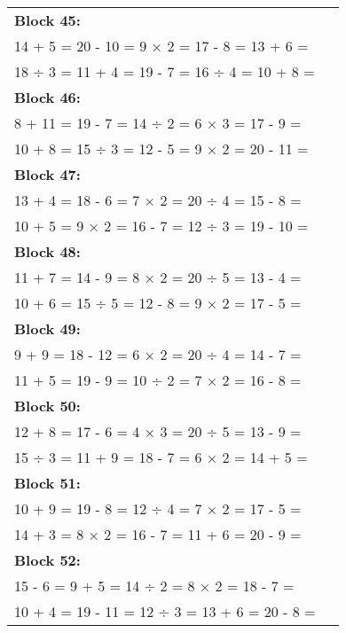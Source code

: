 \documentclass[a4paper,12pt]{scrartcl}
\begin{document}
\begin{adjustbox}{center, valign=c}
\begin{tabular}{@{}p{0.95\linewidth}@{}}

\textbf{Block 45:}\\
14 + 5 = \hfill 20 - 10 = \hfill 9 × 2 = \hfill 17 - 8 = \hfill 13 + 6 =\\
18 ÷ 3 = \hfill 11 + 4 = \hfill 19 - 7 = \hfill 16 ÷ 4 = \hfill 10 + 8 =\\[0.6em]

\textbf{Block 46:}\\
8 + 11 = \hfill 19 - 7 = \hfill 14 ÷ 2 = \hfill 6 × 3 = \hfill 17 - 9 =\\
10 + 8 = \hfill 15 ÷ 3 = \hfill 12 - 5 = \hfill 9 × 2 = \hfill 20 - 11 =\\[0.6em]

\textbf{Block 47:}\\
13 + 4 = \hfill 18 - 6 = \hfill 7 × 2 = \hfill 20 ÷ 4 = \hfill 15 - 8 =\\
10 + 5 = \hfill 9 × 2 = \hfill 16 - 7 = \hfill 12 ÷ 3 = \hfill 19 - 10 =\\[0.6em]

\textbf{Block 48:}\\
11 + 7 = \hfill 14 - 9 = \hfill 8 × 2 = \hfill 20 ÷ 5 = \hfill 13 - 4 =\\
10 + 6 = \hfill 15 ÷ 5 = \hfill 12 - 8 = \hfill 9 × 2 = \hfill 17 - 5 =\\[0.6em]

\textbf{Block 49:}\\
9 + 9 = \hfill 18 - 12 = \hfill 6 × 2 = \hfill 20 ÷ 4 = \hfill 14 - 7 =\\
11 + 5 = \hfill 19 - 9 = \hfill 10 ÷ 2 = \hfill 7 × 2 = \hfill 16 - 8 =\\[0.6em]

\textbf{Block 50:}\\
12 + 8 = \hfill 17 - 6 = \hfill 4 × 3 = \hfill 20 ÷ 5 = \hfill 13 - 9 =\\
15 ÷ 3 = \hfill 11 + 9 = \hfill 18 - 7 = \hfill 6 × 2 = \hfill 14 + 5 =\\[0.6em]

\textbf{Block 51:}\\
10 + 9 = \hfill 19 - 8 = \hfill 12 ÷ 4 = \hfill 7 × 2 = \hfill 17 - 5 =\\
14 + 3 = \hfill 8 × 2 = \hfill 16 - 7 = \hfill 11 + 6 = \hfill 20 - 9 =\\[0.6em]

\textbf{Block 52:}\\
15 - 6 = \hfill 9 + 5 = \hfill 14 ÷ 2 = \hfill 8 × 2 = \hfill 18 - 7 =\\
10 + 4 = \hfill 19 - 11 = \hfill 12 ÷ 3 = \hfill 13 + 6 = \hfill 20 - 8 =\\[0.6em]


\end{tabular}
\end{adjustbox}
\end{document}
